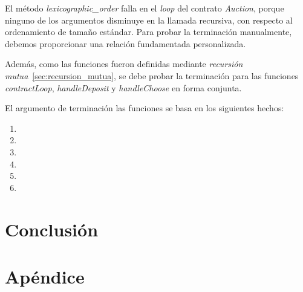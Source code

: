 \documentclass[12pt]{book}
\begin{document}
El método \textit{lexicographic\_order} falla en el \textit{loop} del contrato \textit{Auction}, porque ninguno de los argumentos disminuye en la llamada recursiva, con respecto al ordenamiento de tamaño estándar. Para probar la terminación manualmente, debemos proporcionar una relación fundamentada personalizada.

Además, como las funciones fueron definidas mediante \textit{recursión mutua}~\ref{sec:recursion_mutua}, se debe probar la terminación para las funciones \textit{contractLoop}, \textit{handleDeposit} y \textit{handleChoose} en forma conjunta.

El argumento de terminación las funciones se basa en los siguientes hechos:

\begin{enumerate}
    \item
    \item
    \item
    \item
    \item
    \item
\end{enumerate}





\chapter{Conclusión}



\chapter{Apéndice}





\end{document}
